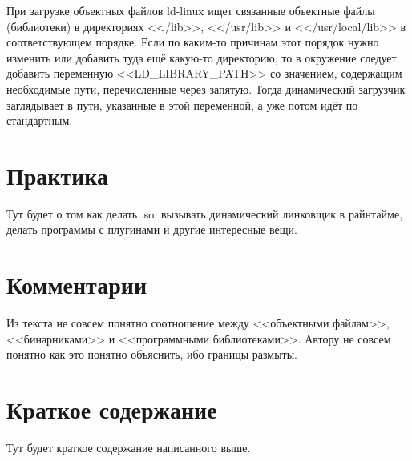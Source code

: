 При загрузке объектных файлов ld-linux ищет связанные объектные файлы (библиотеки) в директориях <</lib>>, <</usr/lib>> и <</usr/local/lib>> в соответствующем порядке.
Если по каким-то причинам этот порядок нужно изменить или добавить туда ещё какую-то директорию, то в окружение следует добавить переменную <<LD\_LIBRARY\_PATH>> со значением, содержащим необходимые пути, перечисленные через запятую.
Тогда динамический загрузчик заглядывает в пути, указанные в этой переменной, а уже потом идёт по стандартным.

\section{Практика}
Тут будет о том как делать .so, вызывать динамический линковщик в райнтайме, делать программы с плугинами и другие интересные вещи.

\section{Комментарии}
Из текста не совсем понятно соотношение между <<объектными файлам>>, <<бинарниками>> и <<программными библиотеками>>.
Автору не совсем понятно как это понятно объяснить, ибо границы размыты.

\section{Краткое содержание}
Тут будет краткое содержание написанного выше.
